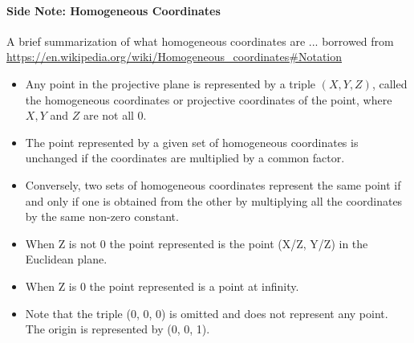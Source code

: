 \documentclass[11pt]{article}
\begin{document}
\begin{mdframed}
	\paragraph{Side Note: Homogeneous Coordinates}
A brief summarization of what homogeneous coordinates are ... borrowed from \url{https://en.wikipedia.org/wiki/Homogeneous_coordinates#Notation}
\begin{itemize}
	\item Any point in the projective plane is represented by a triple $(X, Y, Z)$, called the homogeneous coordinates or projective coordinates of the point, where $X, Y$ and $Z$ are not all 0.
	\item The point represented by a given set of homogeneous coordinates is unchanged if the coordinates are multiplied by a common factor. 
	\item Conversely, two sets of homogeneous coordinates represent the same point if and only if one is obtained from the other by multiplying all the coordinates by the same non-zero constant.
	\item When Z is not 0 the point represented is the point (X/Z, Y/Z) in the Euclidean plane.
	\item When Z is 0 the point represented is a point at infinity.
	\item Note that the triple (0, 0, 0) is omitted and does not represent any point. The origin is represented by (0, 0, 1).
\end{itemize}
\end{mdframed}
\end{document}
